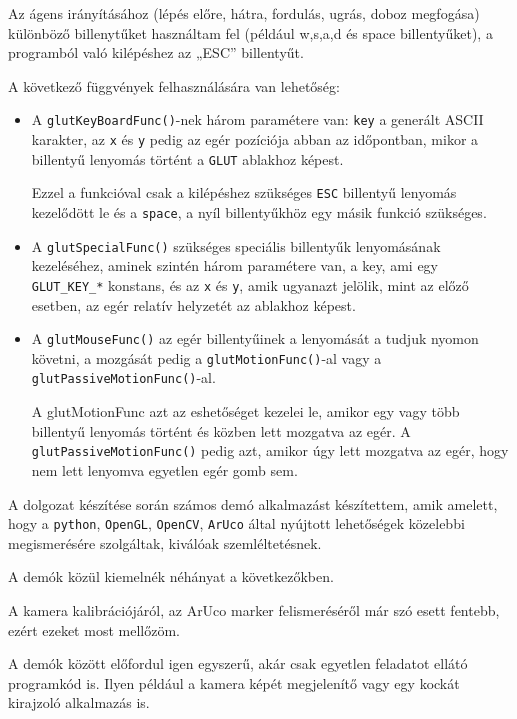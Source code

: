 

Az ágens irányításához (lépés előre, hátra, fordulás, ugrás, doboz megfogása) különböző billenytűket használtam fel (például w,s,a,d és space billentyűket), a  programból való kilépéshez az „ESC” billentyűt. 

A következő függvények felhasználására van lehetőség:
\begin{itemize}
\item A \texttt{glutKeyBoardFunc()}-nek három paramétere van: \texttt{key} a generált ASCII karakter, az \texttt{x} és \texttt{y} pedig az egér pozíciója abban az időpontban, mikor a billentyű lenyomás történt a \texttt{GLUT} ablakhoz képest.

Ezzel a funkcióval csak a kilépéshez szükséges \texttt{ESC} billentyű lenyomás kezelődött le és a \texttt{space}, a nyíl billentyűkhöz egy másik funkció szükséges.
\item A \texttt{glutSpecialFunc()} szükséges speciális billentyűk lenyomásának kezeléséhez,  
aminek szintén három paramétere van, a key, ami egy \texttt{GLUT\_KEY\_*} konstans, és az \texttt{x} és \texttt{y}, amik ugyanazt jelölik, mint az előző esetben, az egér relatív helyzetét az ablakhoz képest.
\item A \texttt{glutMouseFunc()} az egér billentyűinek a lenyomását a  tudjuk nyomon követni, a mozgását pedig a \texttt{glutMotionFunc()}-al vagy a \texttt{glutPassiveMotionFunc()}-al. 

A glutMotionFunc azt az eshetőséget kezelei le, amikor egy vagy több billentyű lenyomás történt és közben lett mozgatva az egér. A \texttt{glutPassiveMotionFunc()} pedig azt, amikor úgy lett mozgatva az egér, hogy nem lett lenyomva egyetlen egér gomb sem.
\end{itemize}


A dolgozat készítése során számos demó alkalmazást készítettem, amik amelett, hogy a \texttt{python}, \texttt{OpenGL}, \texttt{OpenCV}, \texttt{ArUco} által nyújtott lehetőségek közelebbi megismerésére szolgáltak, kiválóak szemléltetésnek.

A demók közül kiemelnék néhányat a következőkben.

A kamera kalibrációjáról, az ArUco marker felismeréséről már szó esett fentebb, ezért ezeket most mellőzöm.

A demók között előfordul igen egyszerű, akár csak egyetlen feladatot ellátó programkód is. Ilyen például a kamera képét megjelenítő vagy egy kockát kirajzoló alkalmazás is.

